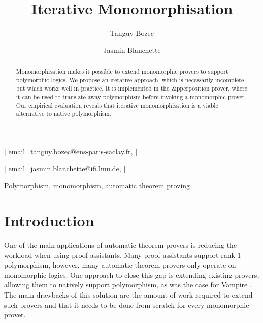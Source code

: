 \documentclass[]{ceurart}
\begin{document}


\title{Iterative Monomorphisation}

\author[1,2]{Tanguy Bozec}[%
email=tanguy.bozec@ens-paris-saclay.fr,
]
\author[2]{Jasmin Blanchette}[%
email=jasmin.blanchette@ifi.lmu.de,
]
\address[1]{ENS Paris-Saclay, Université Paris-Saclay, France}
\address[2]{Institute of Informatics, Ludwig-Maximilians-Universität München, Germany}


\begin{abstract}
Monomorphisation makes it possible to extend monomorphic provers to support polymorphic logics. We propose an iterative approach, which is necessarily incomplete but which works well in practice. It is implemented in the Zipperposition prover, where it can be used to translate away polymorphism before invoking a monomorphic prover. Our empirical evaluation reveals that iterative monomorphisation is a viable alternative to native polymorphism.
\end{abstract}

\begin{keywords}
   Polymorphism\sep
   monomorphism\sep
   automatic theorem proving
\end{keywords}

\maketitle

\section{Introduction}


One of the main applications of automatic theorem provers is reducing the workload when using proof assistants. Many proof assistants support rank-1 polymorphism, however, many automatic theorem provers only operate on monomorphic logics. One approach to close this gap is extending existing provers, allowing them to natively support polymorphism, as was the case for Vampire \cite{vamp}. The main drawbacks of this solution are the amount of work required to extend such provers and that it needs to be done from scratch for every monomorphic prover.
\end{document}
